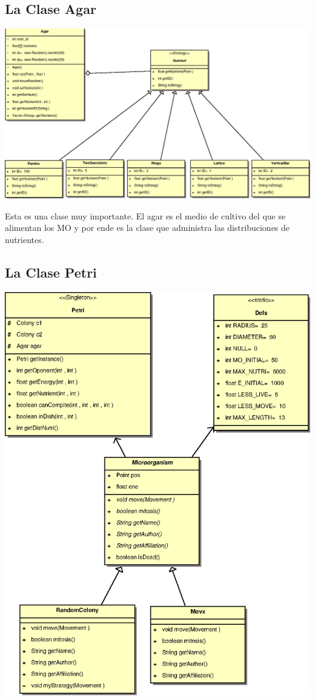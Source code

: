 \documentclass[11pt,a4paper]{article}
\begin{document}
\subsection{La Clase Agar}
\begin{center}
\includegraphics[scale=0.6]{agar}
\end{center}

Esta es una clase muy importante. El agar es el medio de cultivo del que se alimentan los MO y por ende es la clase que administra las distribuciones de nutrientes. 

\subsection{La Clase Petri}
\begin{center}
\includegraphics[scale=0.6]{petri}
\end{center}
\end{document}
